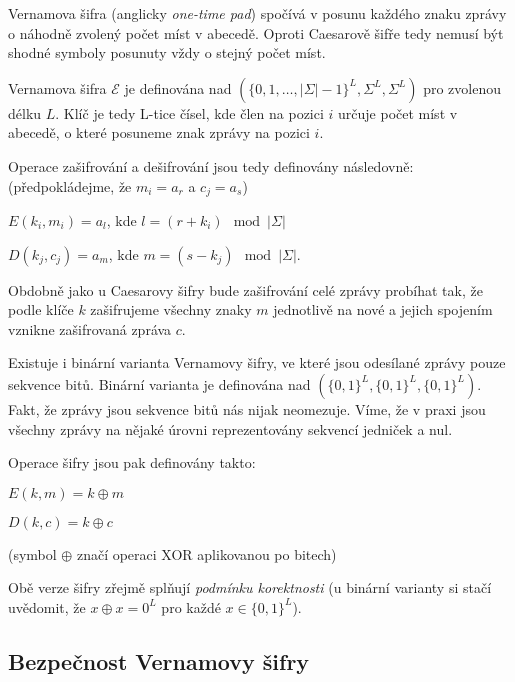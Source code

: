 \documentclass[12pt]{article}
\begin{document}

    Vernamova šifra (anglicky \emph{one-time pad}) spočívá v posunu každého znaku zprávy o náhodně zvolený počet míst v abecedě.
    Oproti Caesarově šifře tedy nemusí být shodné symboly posunuty vždy o stejný počet míst.

    Vernamova šifra $\mathcal{E}$ je definována nad $(\{0, 1, \ldots, |\Sigma|-1\}^L, \Sigma^L, \Sigma^L)$ pro zvolenou délku $L$.
    Klíč je tedy L-tice čísel, kde člen na pozici $i$ určuje počet míst v abecedě, o které posuneme znak zprávy na pozici $i$.

    \medskip

    Operace zašifrování a dešifrování jsou tedy definovány následovně:
    (předpokládejme, že $m_i = a_r$ a $c_j = a_s$)

    \begin{center}
        $E(k_i, m_i) = a_l$, kde $l = (r+k_i)\mod{|\Sigma|}$

        $D(k_j, c_j) = a_m$, kde $m = (s-k_j)\mod{|\Sigma|}$.
    \end{center}

    Obdobně jako u Caesarovy šifry bude zašifrování celé zprávy probíhat tak, že podle klíče $k$ zašifrujeme všechny znaky $m$ jednotlivě na nové a
    jejich spojením vznikne zašifrovaná zpráva $c$.

    \bigskip

    Existuje i binární varianta Vernamovy šifry, ve které jsou odesílané zprávy pouze sekvence bitů.
    Binární varianta je definována nad $(\{0,1\}^L, \{0,1\}^L, \{0,1\}^L)$.
    Fakt, že zprávy jsou sekvence bitů nás nijak neomezuje. Víme, že v praxi jsou všechny zprávy na nějaké úrovni
    reprezentovány sekvencí jedniček a nul.

    \medskip

    Operace šifry jsou pak definovány takto:

    \begin{center}
        $E(k, m) = k \oplus m$

        $D(k, c) = k \oplus c$
    \end{center}

    (symbol $\oplus$ značí operaci XOR aplikovanou po bitech)

    \bigskip
    Obě verze šifry zřejmě splňují \emph{podmínku korektnosti} (u binární varianty si stačí uvědomit, že $x \oplus x = 0^L$ pro každé $x \in \{0,1\}^L$).


    \subsection{Bezpečnost Vernamovy šifry}
\end{document}
